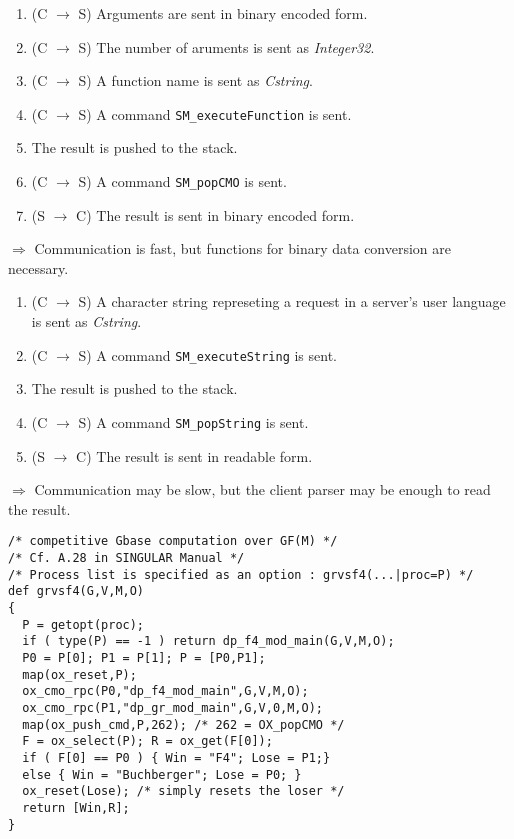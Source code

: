 \begin{slide}{}

\begin{enumerate}
\item (C $\rightarrow$ S) Arguments are sent in binary encoded form.
\item (C $\rightarrow$ S) The number of aruments is sent as {\sl Integer32}.
\item (C $\rightarrow$ S) A function name is sent as {\sl Cstring}.
\item (C $\rightarrow$ S) A command {\tt SM\_executeFunction} is sent.
\item The result is pushed to the stack.
\item (C $\rightarrow$ S) A command {\tt SM\_popCMO} is sent.
\item (S $\rightarrow$ C) The result is sent in binary encoded form.
\end{enumerate}

$\Rightarrow$ Communication is fast, but functions for binary data
conversion are necessary.
\end{slide}

\begin{slide}{}

\begin{enumerate}
\item (C $\rightarrow$ S) A character string represeting a request in a server's
user language is sent as {\sl Cstring}.
\item (C $\rightarrow$ S) A command {\tt SM\_executeString} is sent.
\item The result is pushed to the stack.
\item (C $\rightarrow$ S) A command {\tt SM\_popString} is sent.
\item (S $\rightarrow$ C) The result is sent in readable form.
\end{enumerate}

$\Rightarrow$ Communication may be slow, but the client parser may be
enough to read the result.
\end{slide}

\begin{slide}{}

\begin{verbatim}
/* competitive Gbase computation over GF(M) */
/* Cf. A.28 in SINGULAR Manual */
/* Process list is specified as an option : grvsf4(...|proc=P) */
def grvsf4(G,V,M,O)
{
  P = getopt(proc);
  if ( type(P) == -1 ) return dp_f4_mod_main(G,V,M,O);
  P0 = P[0]; P1 = P[1]; P = [P0,P1];
  map(ox_reset,P);
  ox_cmo_rpc(P0,"dp_f4_mod_main",G,V,M,O);
  ox_cmo_rpc(P1,"dp_gr_mod_main",G,V,0,M,O);
  map(ox_push_cmd,P,262); /* 262 = OX_popCMO */
  F = ox_select(P); R = ox_get(F[0]);
  if ( F[0] == P0 ) { Win = "F4"; Lose = P1;}
  else { Win = "Buchberger"; Lose = P0; }
  ox_reset(Lose); /* simply resets the loser */
  return [Win,R];
}
\end{verbatim}
\end{slide}

